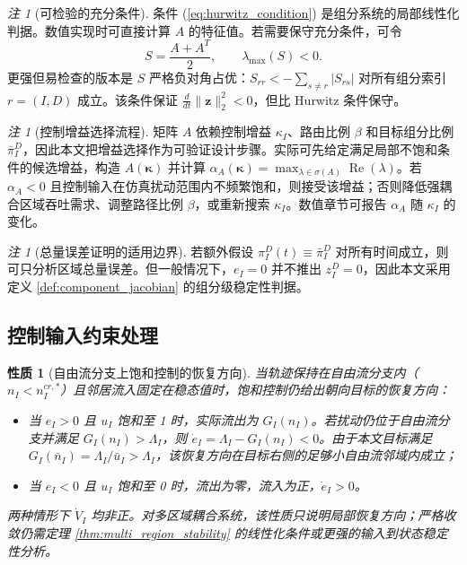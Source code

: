 \documentclass[a4paper,12pt]{article}
\theoremstyle{plain}
\newtheorem{property}[theorem]{性质}
\theoremstyle{definition}
\theoremstyle{remark}
\newtheorem{remark}[theorem]{注}
\begin{document}
\begin{remark}[可检验的充分条件]\label{rem:diagonal_dominance}
条件 (\ref{eq:hurwitz_condition}) 是组分系统的局部线性化判据。数值实现时可直接计算 $A$ 的特征值。若需要保守充分条件，可令
\begin{equation}\label{eq:symmetrized_condition}
    S=\frac{A+A^T}{2},\qquad \lambda_{\max}(S)<0 .
\end{equation}
更强但易检查的版本是 $S$ 严格负对角占优：$S_{rr}<-\sum_{s\ne r}|S_{rs}|$ 对所有组分索引 $r=(I,D)$ 成立。该条件保证 $\frac{d}{dt}\|\bm z\|_2^2<0$，但比 Hurwitz 条件保守。
\end{remark}

\begin{remark}[控制增益选择流程]\label{rem:gain_selection}
矩阵 $A$ 依赖控制增益 $\kappa_I$、路由比例 $\beta$ 和目标组分比例 $\bar\pi_I^D$，因此本文把增益选择作为可验证设计步骤。实际可先给定满足局部不饱和条件的候选增益，构造 $A(\bm\kappa)$ 并计算 $\alpha_A(\bm\kappa)=\max_{\lambda\in\sigma(A)}\operatorname{Re}(\lambda)$。若 $\alpha_A<0$ 且控制输入在仿真扰动范围内不频繁饱和，则接受该增益；否则降低强耦合区域吞吐需求、调整路径比例 $\beta$，或重新搜索 $\kappa_I$。数值章节可报告 $\alpha_A$ 随 $\kappa_I$ 的变化。
\end{remark}

\begin{remark}[总量误差证明的适用边界]\label{rem:total_error_limitation}
若额外假设 $\pi_I^D(t)\equiv\bar\pi_I^D$ 对所有时间成立，则可只分析区域总量误差。但一般情况下，$e_I=0$ 并不推出 $z_I^D=0$，因此本文采用定义 \ref{def:component_jacobian} 的组分级稳定性判据。
\end{remark}

\subsection{控制输入约束处理}

\begin{property}[自由流分支上饱和控制的恢复方向]\label{prop:saturation_stability}
当轨迹保持在自由流分支内（$n_I < n_I^{cr,*}$）且邻居流入固定在稳态值时，饱和控制仍给出朝向目标的恢复方向：
\begin{itemize}
    \item 当 $e_I > 0$ 且 $u_I$ 饱和至 1 时，实际流出为 $G_I(n_I)$。若扰动仍位于自由流分支并满足 $G_I(n_I)>\Lambda_I$，则 $\dot e_I=\Lambda_I-G_I(n_I)<0$。由于本文目标满足 $G_I(\bar n_I)=\Lambda_I/\bar u_I>\Lambda_I$，该恢复方向在目标右侧的足够小自由流邻域内成立；
    \item 当 $e_I < 0$ 且 $u_I$ 饱和至 0 时，流出为零，流入为正，$\dot{e}_I > 0$。
\end{itemize}
两种情形下 $\dot{V}_I$ 均非正。对多区域耦合系统，该性质只说明局部恢复方向；严格收敛仍需定理 \ref{thm:multi_region_stability} 的线性化条件或更强的输入到状态稳定性分析。
\end{property}
\end{document}
